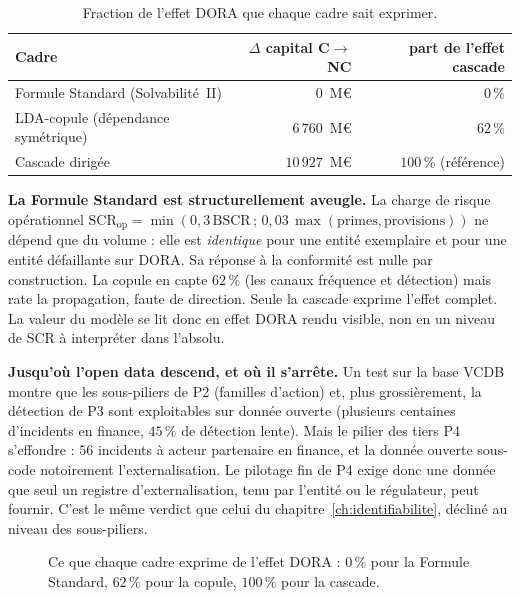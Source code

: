 \begin{table}[htbp]\centering\small
\renewcommand{\arraystretch}{1.25}
\begin{tabular}{@{}l r r@{}}
\toprule
\textbf{Cadre} & \textbf{$\Delta$ capital C$\to$NC} & \textbf{part de l'effet cascade} \\
\midrule
Formule Standard (Solvabilité~II) & $0$~M\euro{} & $0\,\%$ \\
LDA-copule (dépendance symétrique) & $6\,760$~M\euro{} & $62\,\%$ \\
Cascade dirigée & $10\,927$~M\euro{} & $100\,\%$ (référence) \\
\bottomrule
\end{tabular}
\caption{Fraction de l'effet DORA que chaque cadre sait exprimer.}
\label{tab:benchmark-sf}
\end{table}

\textbf{La Formule Standard est structurellement aveugle.} La charge de risque opérationnel
$\mathrm{SCR}_{\text{op}} = \min(0{,}3\,\mathrm{BSCR}\,;\,0{,}03\,\max(\text{primes},
\text{provisions}))$ ne dépend que du volume : elle est \emph{identique} pour une entité
exemplaire et pour une entité défaillante sur DORA. Sa réponse à la conformité est nulle par
construction. La copule en capte $62\,\%$ (les canaux fréquence et détection) mais rate la
propagation, faute de direction. Seule la cascade exprime l'effet complet. La valeur du
modèle se lit donc en effet DORA rendu visible, non en un niveau de SCR à
interpréter dans l'absolu.

\begin{cle}
\textbf{Jusqu'où l'open data descend, et où il s'arrête.} Un test sur
la base VCDB montre que les sous-piliers de P2 (familles d'action) et, plus grossièrement,
la détection de P3 sont exploitables sur donnée ouverte (plusieurs centaines d'incidents en
finance, $45\,\%$ de détection lente). Mais le pilier des tiers P4 s'effondre : $56$
incidents à acteur partenaire en finance, et la donnée ouverte sous-code notoirement
l'externalisation. Le pilotage fin de P4 exige donc une donnée que seul un registre
d'externalisation, tenu par l'entité ou le régulateur, peut fournir. C'est le même verdict
que celui du chapitre~\ref{ch:identifiabilite}, décliné au niveau des sous-piliers.
\end{cle}

\begin{figure}[htbp]\centering
{}
\caption{Ce que chaque cadre exprime de l'effet DORA : $0\,\%$ pour la Formule Standard,
$62\,\%$ pour la copule, $100\,\%$ pour la cascade.}
\label{fig:benchmark-sf}
\end{figure}

